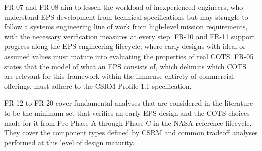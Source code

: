 FR-07 and FR-08 aim to lessen the workload of inexperienced engineers, who understand EPS development from technical specifications but may struggle to follow a systems engineering line of work from high-level mission requirements, with the necessary verification measures at every step.
FR-10 and FR-11 support progress along the EPS engineering lifecycle, where early designs with ideal or assumed values must mature into evaluating the properties of real COTS.
FR-05 states that the model of what an EPS consists of, which delimits which COTS are relevant for this framework within the immense entirety of commercial offerings, must adhere to the CSRM Profile 1.1 specification.

FR-12 to FR-20 cover fundamental analyses that are considered in the literature to be the minimum set that verifies an early EPS design and the COTS choices made for it from Pre-Phase A through Phase C in the NASA reference lifecycle.
They cover the component types defined by CSRM and common tradeoff analyses performed at this level of design maturity.

